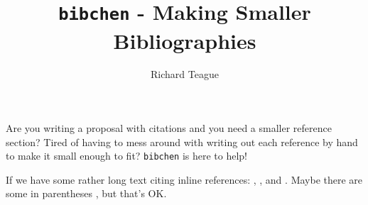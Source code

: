 \documentclass[a4paper, 12pt]{article}
\title{\texttt{bibchen} - Making Smaller Bibliographies}
\author{Richard Teague}
\begin{document}
\maketitle{}

Are you writing a proposal with citations and you need a smaller reference
section? Tired of having to mess around with writing out each reference by hand
to make it small enough to fit? \texttt{bibchen} is here to help!

If we have some rather long text citing inline references:
\citet{Teague_ea_2018}, \citet{Teague_Foreman-Mackey_2018}, and
\citet{Teague_ea_2017}. Maybe there are some in parentheses
\citep{Teague_ea_2015, Teague_ea_2016}, but that's OK.


{}
\end{document}
